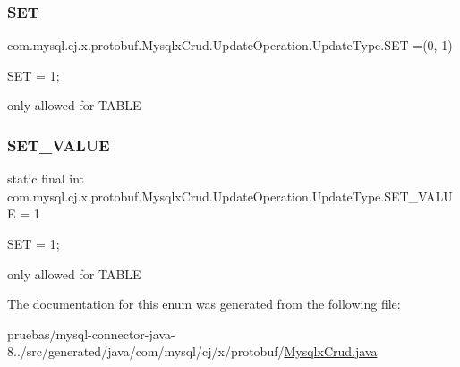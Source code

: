 \subsubsection{\texorpdfstring{S\+ET}{SET}}
{\footnotesize\ttfamily com.\+mysql.\+cj.\+x.\+protobuf.\+Mysqlx\+Crud.\+Update\+Operation.\+Update\+Type.\+S\+ET =(0, 1)}

{\ttfamily S\+ET = 1;}


\begin{DoxyPre}
only allowed for TABLE
\end{DoxyPre}
 \mbox{\label{enumcom_1_1mysql_1_1cj_1_1x_1_1protobuf_1_1_mysqlx_crud_1_1_update_operation_1_1_update_type_a8f46778d8f35bf7ede964db702952197}} 
\subsubsection{\texorpdfstring{S\+E\+T\+\_\+\+V\+A\+L\+UE}{SET\_VALUE}}
{\footnotesize\ttfamily  static  final int com.\+mysql.\+cj.\+x.\+protobuf.\+Mysqlx\+Crud.\+Update\+Operation.\+Update\+Type.\+S\+E\+T\+\_\+\+V\+A\+L\+UE = 1\hspace{0.3cm}{\ttfamily [static]}}

{\ttfamily S\+ET = 1;}


\begin{DoxyPre}
only allowed for TABLE
\end{DoxyPre}
 

The documentation for this enum was generated from the following file\+:\begin{DoxyCompactItemize}
\item 
pruebas/mysql-\/connector-\/java-\/8../src/generated/java/com/mysql/cj/x/protobuf/\mbox{\hyperlink{_mysqlx_crud_8java}{Mysqlx\+Crud.\+java}}\end{DoxyCompactItemize}
